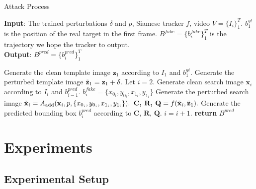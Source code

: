\documentclass[journal]{IEEEtran}
\begin{document}
\begin{algorithm}[tb]
  \small
  \caption{Attack Process}
  \label{alg:algorithm_attack}
  \textbf{Input}: The trained perturbations $\delta$ and $p$, Siamese tracker $f$, video $V=\{I_i\}_1^T$. $b^{gt}_1$ is the position of the real target in the first frame. $B^{fake}=\{b^{fake}_i\}_1^{T}$ is the trajectory we hope the tracker to output.\\
  \textbf{Output}: $B^{pred}=\{b^{pred}_i\}_1^{T}$
  \begin{algorithmic}[1] %
    \STATE Generate the clean template image $\textbf{z}_1$ according to $I_1$ and $b^{gt}_1$.
    \STATE Generate the perturbed template image $\tilde{\textbf z}_1=\textbf z_1+\delta$.
    \STATE Let $i = 2$.
  \STATE Generate clean search image $\textbf{x}_i$ according to $I_i$ and $b^{pred}_{i-1}$.
  \STATE $b^{fake}_i=\{x_{0_i}, y_{0_i}, x_{1_i}, y_{1_i}\}$
  \STATE Generate the perturbed search image $\tilde{\textbf x}_i = A_{\text{add}}(\textbf x_i, p, \{x_{0_i}, y_{0_i}, x_{1_i}, y_{1_i}\}).$
  \STATE $\textbf{C, R, Q} = f(\tilde {\textbf x}_i, \tilde{\textbf z}_1).$
  \STATE Generate the predicted bounding box $b^{pred}_i$ according to $\textbf{C, R, Q}$.
  \STATE $i = i + 1.$
  \ENDWHILE
  \STATE \textbf{return} $B^{pred}$
  \end{algorithmic}
\end{algorithm}

\section{Experiments}

\subsection{Experimental Setup}\label{setup}
\end{document}

